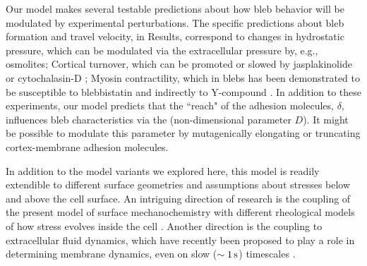 Our model makes several testable predictions about how bleb behavior will be modulated by experimental perturbations. The specific predictions about bleb formation and travel velocity, in Results, correspond to changes in hydrostatic pressure, which can be modulated via the extracellular pressure by, e.g., osmolites; Cortical turnover, which can be promoted or slowed by jasplakinolide or cytochalasin-D \cite{Clark:2013ef, Sedzinski:2011ef}; Myosin contractility, which in blebs has been demonstrated to be susceptible to blebbistatin and indirectly to Y-compound \cite{Tinevez:2009bh}. In addition to these experiments, our model predicts that the ``reach" of the adhesion molecules, $\delta$, influences bleb characteristics via the (non-dimensional parameter $D$). It might be possible to modulate this parameter by mutagenically elongating or truncating cortex-membrane adhesion molecules. 

In addition to the model variants we explored here, this model is readily extendible to different surface geometries and assumptions about stresses below and above the cell surface. An intriguing direction of research is the coupling of the present model of surface mechanochemistry with different rheological models of how stress evolves inside the cell \cite{Strychalski:HizQv1Ti, Charras:2009dp}. Another direction is the coupling to extracellular fluid dynamics, which have recently been proposed to play a role in determining membrane dynamics, even on slow ($\sim 1\,\mbox{s}$) timescales \cite{Anonymous:roDfYIJA}.


